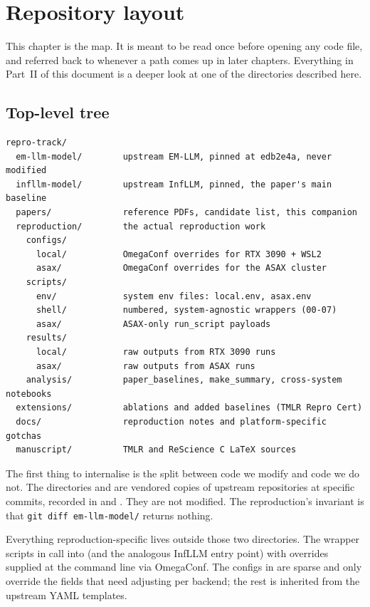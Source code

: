 \section{Repository layout}
\label{sec:repo-layout}

This chapter is the map. It is meant to be read once before opening any code file, and referred back to whenever a path comes up in later chapters. Everything in Part~II of this document is a deeper look at one of the directories described here.

\subsection{Top-level tree}
\label{sec:repo-tree}

\begin{lstlisting}[style=shellstyle,basicstyle=\ttfamily\footnotesize]
repro-track/
  em-llm-model/        upstream EM-LLM, pinned at edb2e4a, never modified
  infllm-model/        upstream InfLLM, pinned, the paper's main baseline
  papers/              reference PDFs, candidate list, this companion
  reproduction/        the actual reproduction work
    configs/
      local/           OmegaConf overrides for RTX 3090 + WSL2
      asax/            OmegaConf overrides for the ASAX cluster
    scripts/
      env/             system env files: local.env, asax.env
      shell/           numbered, system-agnostic wrappers (00-07)
      asax/            ASAX-only run_script payloads
    results/
      local/           raw outputs from RTX 3090 runs
      asax/            raw outputs from ASAX runs
    analysis/          paper_baselines, make_summary, cross-system notebooks
  extensions/          ablations and added baselines (TMLR Repro Cert)
  docs/                reproduction notes and platform-specific gotchas
  manuscript/          TMLR and ReScience C LaTeX sources
\end{lstlisting}

The first thing to internalise is the split between code we modify and code we do not. The directories  and  are vendored copies of upstream repositories at specific commits, recorded in  and . They are not modified. The reproduction's invariant is that \texttt{git diff em-llm-model/} returns nothing.

Everything reproduction-specific lives outside those two directories. The wrapper scripts in  call into  (and the analogous InfLLM entry point) with overrides supplied at the command line via OmegaConf. The configs in  are sparse and only override the fields that need adjusting per backend; the rest is inherited from the upstream YAML templates.

